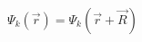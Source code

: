 \documentclass[preview]{standalone}
\begin{document}
\begin{align*}
\Psi_k(\vec{r})=\Psi_k(\vec{r}+\vec{R})
\end{align*}
\end{document}
